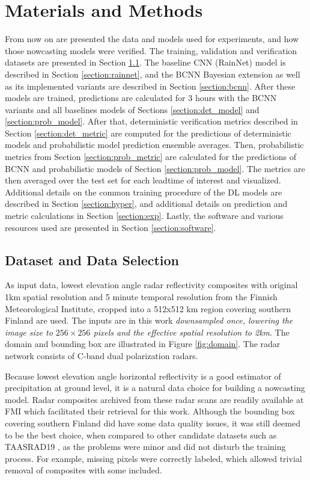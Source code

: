 \chapter{Materials and Methods}
\label{chapter:methods}

From now on are presented the data and models used for experiments, and how those nowcasting models were verified. The training, validation and verification datasets are presented in Section \ref{section:data}. The baseline CNN (RainNet) model is described in Section \ref{section:rainnet}, and the BCNN Bayesian extension as well as its implemented variants are described in Section \ref{section:bcnn}. After these models are trained, predictions are calculated for 3 hours with the BCNN variants and all baselines models of Sections \ref{section:det_model} and \ref{section:prob_model}. After that, deterministic verification metrics described in Section \ref{section:det_metric} are computed for the predictions of deterministic models and probabilistic model prediction ensemble averages. Then, probabilistic metrics from Section \ref{section:prob_metric} are calculated for the predictions of BCNN and probabilistic models of Section \ref{section:prob_model}. The metrics are then averaged over the test set for each leadtime of interest and visualized. Additional details on the common training procedure of the DL models are described in Section \ref{section:hyper}, and additional details on prediction and metric calculations in Section \ref{section:exp}. Lastly, the software and various resources used are presented in Section \ref{section:software}.


\section{Dataset and Data Selection}
\label{section:data}

As input data, lowest elevation angle radar reflectivity composites with original 1km spatial resolution and 5 minute temporal resolution from the Finnish Meteorological Institute, cropped into a 512x512 km region covering southern Finland are used. The inputs are in this work \textit{downsampled once, lowering the image size to $256 \times 256$ pixels and the effective spatial resolution to 2km}. The domain and bounding box are illustrated in Figure \ref{fig:domain}. The radar network consists of C-band dual polarization radars. 

Because lowest elevation angle horizontal reflectivity is a good estimator of precipitation at ground level, it is a natural data choice for building a nowcasting model. Radar composites archived from these radar scans are readily available at FMI which facilitated their retrieval for this work. Although the bounding box covering southern Finland did have some data quality issues, it was still deemed to be the best choice, when compared to other candidate datasets such as TAASRAD19 \cite{franch_taasrad19_2020}, as the problems were minor and did not disturb the training process. For example, missing pixels were correctly labeled, which allowed trivial removal of composites with some included. 

